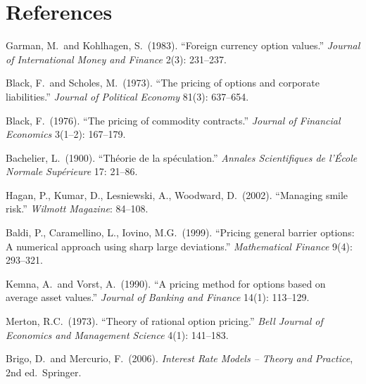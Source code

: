 \documentclass[11pt,a4paper]{article}
\theoremstyle{definition}
\begin{document}
\section*{References}

\begin{enumerate}[label={[\arabic*]}]
  \item Garman, M.\ and Kohlhagen, S.\ (1983).  ``Foreign currency option values.''
        \textit{Journal of International Money and Finance} 2(3): 231--237.
  \item Black, F.\ and Scholes, M.\ (1973).  ``The pricing of options and corporate liabilities.''
        \textit{Journal of Political Economy} 81(3): 637--654.
  \item Black, F.\ (1976).  ``The pricing of commodity contracts.''
        \textit{Journal of Financial Economics} 3(1--2): 167--179.
  \item Bachelier, L.\ (1900).  ``Th\'eorie de la sp\'eculation.''
        \textit{Annales Scientifiques de l'\'Ecole Normale Sup\'erieure} 17: 21--86.
  \item Hagan, P., Kumar, D., Lesniewski, A., Woodward, D.\ (2002).
        ``Managing smile risk.''
        \textit{Wilmott Magazine}: 84--108.
  \item Baldi, P., Caramellino, L., Iovino, M.G.\ (1999).
        ``Pricing general barrier options: A numerical approach using sharp large deviations.''
        \textit{Mathematical Finance} 9(4): 293--321.
  \item Kemna, A.\ and Vorst, A.\ (1990).
        ``A pricing method for options based on average asset values.''
        \textit{Journal of Banking and Finance} 14(1): 113--129.
  \item Merton, R.C.\ (1973).  ``Theory of rational option pricing.''
        \textit{Bell Journal of Economics and Management Science} 4(1): 141--183.
  \item Brigo, D.\ and Mercurio, F.\ (2006).
        \textit{Interest Rate Models -- Theory and Practice}, 2nd ed.\ Springer.
\end{enumerate}
\end{document}
